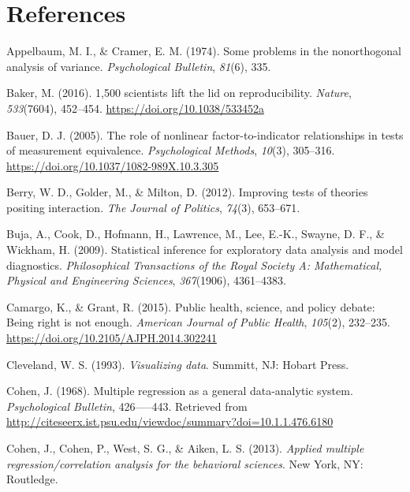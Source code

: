 \documentclass[
  man,floatsintext]{apa6}
\newlength{\cslhangindent}
\newenvironment{CSLReferences}[2] %
 {\begin{list}{}{%
  \setlength{\itemindent}{0pt}
  \setlength{\leftmargin}{0pt}
  \setlength{\parsep}{0pt}
  \ifodd #1
   \setlength{\leftmargin}{\cslhangindent}
   \setlength{\itemindent}{-1\cslhangindent}
  \fi
  \setlength{\itemsep}{#2\baselineskip}}}
 {\end{list}}
\begin{document}
\pagebreak

\section*{References}\label{references}

\label{refs}
\begin{CSLReferences}{1}{0}
Appelbaum, M. I., \& Cramer, E. M. (1974). {Some problems in the nonorthogonal analysis of variance.} \emph{Psychological Bulletin}, \emph{81}(6), 335.

Baker, M. (2016). 1,500 scientists lift the lid on reproducibility. \emph{Nature}, \emph{533}(7604), 452--454. \url{https://doi.org/10.1038/533452a}

Bauer, D. J. (2005). {The role of nonlinear factor-to-indicator relationships in tests of measurement equivalence}. \emph{Psychological Methods}, \emph{10}(3), 305--316. \url{https://doi.org/10.1037/1082-989X.10.3.305}

Berry, W. D., Golder, M., \& Milton, D. (2012). Improving tests of theories positing interaction. \emph{The Journal of Politics}, \emph{74}(3), 653--671.

Buja, A., Cook, D., Hofmann, H., Lawrence, M., Lee, E.-K., Swayne, D. F., \& Wickham, H. (2009). Statistical inference for exploratory data analysis and model diagnostics. \emph{Philosophical Transactions of the Royal Society A: Mathematical, Physical and Engineering Sciences}, \emph{367}(1906), 4361--4383.

Camargo, K., \& Grant, R. (2015). Public health, science, and policy debate: Being right is not enough. \emph{American Journal of Public Health}, \emph{105}(2), 232--235. \url{https://doi.org/10.2105/AJPH.2014.302241}

Cleveland, W. S. (1993). \emph{{Visualizing data}}. Summitt, NJ: Hobart Press.

Cohen, J. (1968). {Multiple regression as a general data-analytic system}. \emph{Psychological Bulletin}, 426-----443. Retrieved from \url{http://citeseerx.ist.psu.edu/viewdoc/summary?doi=10.1.1.476.6180}

Cohen, J., Cohen, P., West, S. G., \& Aiken, L. S. (2013). \emph{{Applied multiple regression/correlation analysis for the behavioral sciences}}. New York, NY: Routledge.


\end{CSLReferences}
\end{document}
